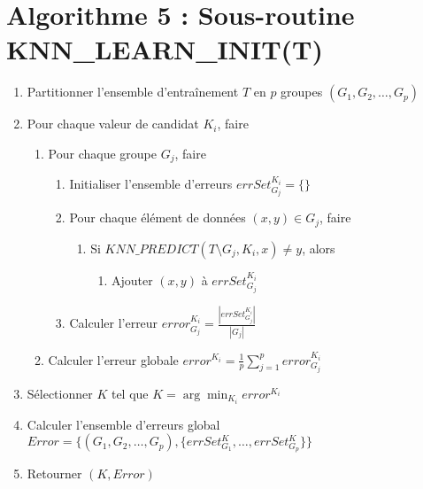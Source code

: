 \documentclass{article}
\begin{document}
\section*{Algorithme 5 : Sous-routine KNN\_LEARN\_INIT(T)}

\begin{enumerate}
    \item Partitionner l'ensemble d'entraînement \(T\) en \(p\) groupes \((G_1, G_2, \ldots, G_p)\)
    \item Pour chaque valeur de candidat \(K_i\), faire
    \begin{enumerate}
        \item Pour chaque groupe \(G_j\), faire
        \begin{enumerate}
            \item Initialiser l'ensemble d'erreurs \(errSet^{K_i}_{G_j} = \{\}\)
            \item Pour chaque élément de données \((x, y) \in G_j\), faire
            \begin{enumerate}
                \item Si \(KNN\_PREDICT(T \setminus G_j, K_i, x) \neq y\), alors
                \begin{enumerate}
                    \item Ajouter \((x, y)\) à \(errSet^{K_i}_{G_j}\)
                \end{enumerate}
            \end{enumerate}
            \item Calculer l'erreur \(error^{K_i}_{G_j} = \frac{|errSet^{K_i}_{G_j}|}{|G_j|}\)
        \end{enumerate}
        \item Calculer l'erreur globale \(error^{K_i} = \frac{1}{p} \sum_{j=1}^{p} error^{K_i}_{G_j}\)
    \end{enumerate}
    \item Sélectionner \(K\) tel que \(K = \arg\min_{K_i} error^{K_i}\)
    \item Calculer l'ensemble d'erreurs global \(Error = \{(G_1, G_2, \ldots, G_p), \{errSet^{K}_{G_1}, \ldots, errSet^{K}_{G_p}\}\}\)
    \item Retourner \((K, Error)\)
\end{enumerate}
\end{document}
